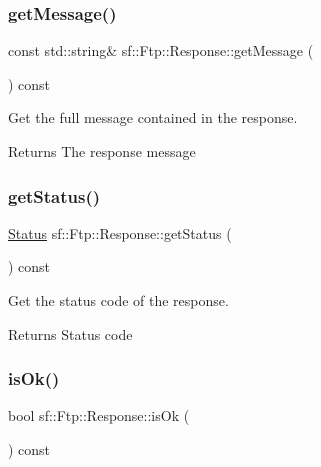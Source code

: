 \subsubsection{\texorpdfstring{getMessage()}{getMessage()}}
{\footnotesize\ttfamily const std\+::string\& sf\+::\+Ftp\+::\+Response\+::get\+Message (\begin{DoxyParamCaption}{ }\end{DoxyParamCaption}) const}



Get the full message contained in the response. 

\begin{DoxyReturn}{Returns}
The response message \begin{DoxyVerb}\end{DoxyVerb}
 
\end{DoxyReturn}
\mbox{\label{classsf_1_1_ftp_1_1_response_a52bbca9fbf5451157bc055e3d8430c25}} 
\subsubsection{\texorpdfstring{getStatus()}{getStatus()}}
{\footnotesize\ttfamily \mbox{\hyperlink{classsf_1_1_ftp_1_1_response_af81738f06b6f571761696291276acb3b}{Status}} sf\+::\+Ftp\+::\+Response\+::get\+Status (\begin{DoxyParamCaption}{ }\end{DoxyParamCaption}) const}



Get the status code of the response. 

\begin{DoxyReturn}{Returns}
Status code \begin{DoxyVerb}\end{DoxyVerb}
 
\end{DoxyReturn}
\mbox{\label{classsf_1_1_ftp_1_1_response_a5102552955a2652c1a39e9046e617b36}} 
\subsubsection{\texorpdfstring{isOk()}{isOk()}}
{\footnotesize\ttfamily bool sf\+::\+Ftp\+::\+Response\+::is\+Ok (\begin{DoxyParamCaption}{ }\end{DoxyParamCaption}) const}



